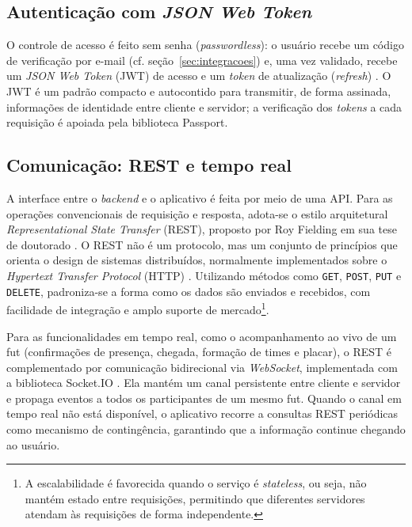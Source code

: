         \subsection{Autenticação com \textit{JSON Web Token}}
        \label{subsec:tec-jwt}
        O controle de acesso é feito sem senha (\textit{passwordless}): o usuário recebe um código de verificação por e-mail (cf. seção~\ref{sec:integracoes}) e, uma vez validado, recebe um \textit{JSON Web Token} (JWT) de acesso e um \textit{token} de atualização (\textit{refresh}) \cite{jwt_rfc7519}. O JWT é um padrão compacto e autocontido para transmitir, de forma assinada, informações de identidade entre cliente e servidor; a verificação dos \textit{tokens} a cada requisição é apoiada pela biblioteca Passport.

        \subsection{Comunicação: REST e tempo real}
        A interface entre o \textit{backend} e o aplicativo é feita por meio de uma API. Para as operações convencionais de requisição e resposta, adota-se o estilo arquitetural \textit{Representational State Transfer} (REST), proposto por Roy Fielding em sua tese de doutorado \cite{fielding2000}. O REST não é um protocolo, mas um conjunto de princípios que orienta o design de sistemas distribuídos, normalmente implementados sobre o \textit{Hypertext Transfer Protocol} (HTTP) \cite{rfc7231}. Utilizando métodos como \texttt{GET}, \texttt{POST}, \texttt{PUT} e \texttt{DELETE}, padroniza-se a forma como os dados são enviados e recebidos, com facilidade de integração e amplo suporte de mercado\footnote{A escalabilidade é favorecida quando o serviço é \textit{stateless}, ou seja, não mantém estado entre requisições, permitindo que diferentes servidores atendam às requisições de forma independente.}.

        Para as funcionalidades em tempo real, como o acompanhamento ao vivo de um fut (confirmações de presença, chegada, formação de times e placar), o REST é complementado por comunicação bidirecional via \textit{WebSocket}, implementada com a biblioteca Socket.IO \cite{socketio_docs}. Ela mantém um canal persistente entre cliente e servidor e propaga eventos a todos os participantes de um mesmo fut. Quando o canal em tempo real não está disponível, o aplicativo recorre a consultas REST periódicas como mecanismo de contingência, garantindo que a informação continue chegando ao usuário.

